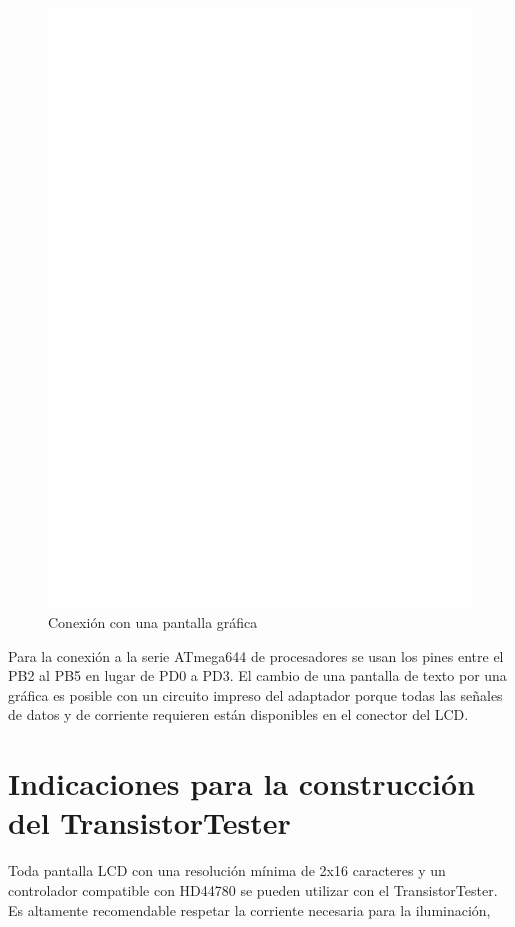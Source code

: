 \begin{figure}[H]
\centering
\includegraphics[width=14cm]{../FIG/ST7565lcd.eps}
\caption{Conexión con una pantalla gráfica}
\label{fig:ST7565lcd}
\end{figure}

Para la conexión a la serie  ATmega644 de procesadores se usan los pines entre el PB2 al PB5  en lugar de PD0 a PD3. El
cambio de  una pantalla de  texto por una  gráfica es posible con  un circuito impreso  del adaptador porque  todas las
señales de datos y de corriente requieren están disponibles en el conector del LCD.

\section{Indicaciones para la construcción del TransistorTester}

Toda pantalla  LCD con una  resolución mínima de  2x16 caracteres  y un controlador  compatible con HD44780  se pueden
utilizar con el TransistorTester. Es altamente recomendable respetar la corriente necesaria para la iluminación,



